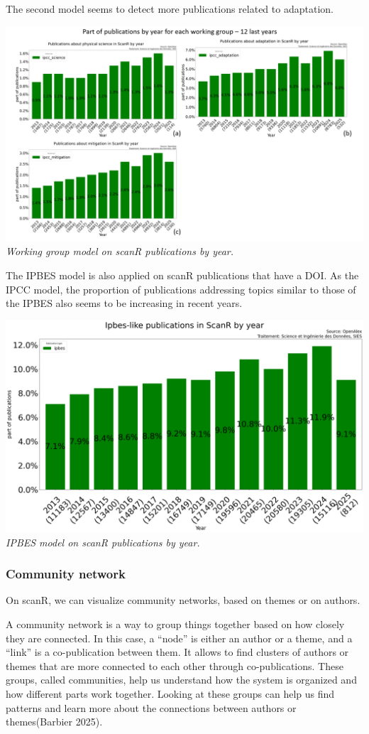 \documentclass[
]{article}
\begin{document}
The second model seems to detect more publications related to
adaptation.

\includegraphics{./images/teds_model_scanR_wg.png} \emph{Working group
model on scanR publications by year.}

The IPBES model is also applied on scanR publications that have a DOI.
As the IPCC model, the proportion of publications addressing topics
similar to those of the IPBES also seems to be increasing in recent
years.

\includegraphics{./images/teds_model_scanR2.png} \emph{IPBES model on
scanR publications by year.}

\hypertarget{community-network}{%
\subsubsection{Community network}\label{community-network}}

On scanR, we can visualize community networks, based on themes or on
authors.

A community network is a way to group things together based on how
closely they are connected. In this case, a ``node'' is either an author
or a theme, and a ``link'' is a co-publication between them. It allows
to find clusters of authors or themes that are more connected to each
other through co-publications. These groups, called communities, help us
understand how the system is organized and how different parts work
together. Looking at these groups can help us find patterns and learn
more about the connections between authors or themes(Barbier 2025).
\end{document}
